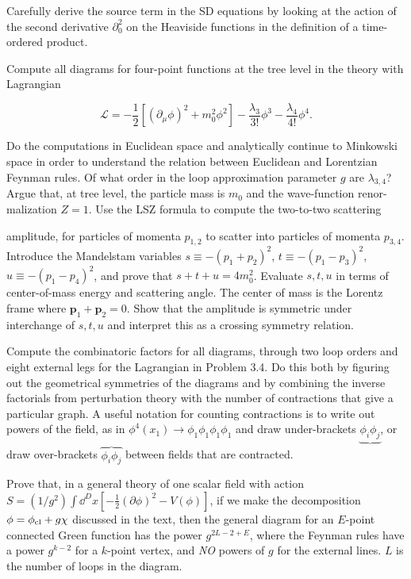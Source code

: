 \begin{banksproblems}
Carefully derive the source term in the SD equations by looking at the action
of the second derivative $\partial_0^2$ on the Heaviside functions in the definition of a
time-ordered product.

Compute all diagrams for four-point functions at the tree level in the theory with
Lagrangian

\[
\mathcal{L}=-\frac12\left[(\partial_\mu\phi)^2+m_0^2\phi^2\right]
-\frac{\lambda_3}{3!}\phi^3-\frac{\lambda_4}{4!}\phi^4.
\]

Do the computations in Euclidean space and analytically continue to Minkowski
space in order to understand the relation between Euclidean and Lorentzian
Feynman rules. Of what order in the loop approximation parameter $g$ are $\lambda_{3,4}$?
Argue that, at tree level, the particle mass is $m_0$ and the wave-function renor-
malization $Z=1$. Use the LSZ formula to compute the two-to-two scattering

amplitude, for particles of momenta $p_{1,2}$ to scatter into particles of momenta $p_{3,4}$.
Introduce the Mandelstam variables $s\equiv-(p_1+p_2)^2$, $t\equiv-(p_1-p_3)^2$,
$u\equiv-(p_1-p_4)^2$, and prove that $s+t+u=4m_0^2$. Evaluate $s,t,u$ in terms of
center-of-mass energy and scattering angle. The center of mass is the Lorentz frame where
$\mathbf p_1+\mathbf p_2=0$. Show that the amplitude is symmetric under interchange of $s,t,u$ and interpret
this as a crossing symmetry relation.

Compute the combinatoric factors for all diagrams, through two loop orders and eight
external legs for the Lagrangian in Problem 3.4. Do this both by figuring out the
geometrical symmetries of the diagrams and by combining the inverse factorials from
perturbation theory with the number of contractions that give a particular graph. A useful
notation for counting contractions is to write out powers of the field, as in
$\phi^4(x_1)\to\phi_1\phi_1\phi_1\phi_1$ and draw under-brackets $\underbrace{\phi_i\phi_j}$, or draw over-brackets
$\overbrace{\phi_i\phi_j}$ between fields that are contracted.

Prove that, in a general theory of one scalar field with action
$S=(1/g^2)\int\dd^D x[-\frac12(\partial\phi)^2-V(\phi)]$,
if we make the decomposition $\phi=\phi_{\rm cl}+g\chi$ discussed in the text, then
the general diagram for an $E$-point connected Green function has the power
$g^{2L-2+E}$, where the Feynman rules have a power $g^{k-2}$ for a $k$-point vertex, and
\emph{NO} powers of $g$ for the external lines. $L$ is the number of loops in the diagram.

\end{banksproblems}
